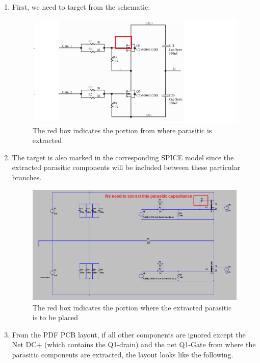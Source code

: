 \begin{enumerate}

\item First, we need to target from the schematic:

\begin{figure} [H]
  \centering
  \includegraphics[width=\linewidth]{pictures/examples/Schematic5.png}
  \caption{The red box indicates the portion from where parasitic is extracted}
  \label{fig:schematic5}
\end{figure}

\item  The target is also marked in the corresponding SPICE model since the extracted parasitic components will be included between these particular branches.

\begin{figure} [H]
  \centering
  \includegraphics[width=\linewidth]{pictures/examples/spice5.png}
  \caption{The red box indicates the portion where the extracted parasitic is to be placed}
  \label{fig:spice5}
\end{figure}

\item From the PDF PCB layout, if all other components are ignored  except the Net DC+ (which contains the Q1-drain) and the net Q1-Gate from where the parasitic components are extracted, the layout looks like the following.


\end{enumerate}
